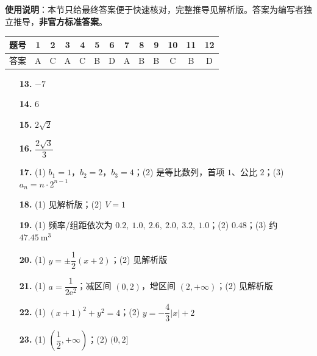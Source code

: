 
\begin{gknotice}
\textbf{使用说明}：本节只给最终答案便于快速核对，完整推导见解析版。答案为编写者独立推导，\textbf{非官方标准答案}。
\end{gknotice}

\begin{center}\begin{tabular}{ccccccccccccc}
\toprule
题号 & 1 & 2 & 3 & 4 & 5 & 6 & 7 & 8 & 9 & 10 & 11 & 12 \\
\midrule
答案 & A & C & A & C & B & D & A & B & B & C & B & D \\
\bottomrule
\end{tabular}\end{center}

\begin{itemize}[leftmargin=2.6em]
  \item[\textbf{13.}] $-7$
  \item[\textbf{14.}] $6$
  \item[\textbf{15.}] $2\sqrt2$
  \item[\textbf{16.}] $\dfrac{2\sqrt3}3$
\end{itemize}

\begin{itemize}[leftmargin=2.6em]
  \item[\textbf{17.}] (1) $b_1=1$，$b_2=2$，$b_3=4$；(2) 是等比数列，首项 $1$、公比 $2$；(3) $a_n=n\cdot2^{n-1}$
  \item[\textbf{18.}] (1) 见解析版；(2) $V=1$
  \item[\textbf{19.}] (1) 频率/组距依次为 $0.2,\ 1.0,\ 2.6,\ 2.0,\ 3.2,\ 1.0$；(2) $0.48$；(3) 约 $47.45\ \mathrm m^{3}$
  \item[\textbf{20.}] (1) $y=\pm\dfrac12(x+2)$；(2) 见解析版
  \item[\textbf{21.}] (1) $a=\dfrac1{2\mathrm e^{2}}$；减区间 $(0,2)$，增区间 $(2,+\infty)$；(2) 见解析版
\end{itemize}

\begin{itemize}[leftmargin=2.6em]
  \item[\textbf{22.}] (1) $(x+1)^{2}+y^{2}=4$；(2) $y=-\dfrac43|x|+2$
  \item[\textbf{23.}] (1) $\left(\dfrac12,+\infty\right)$；(2) $(0,2]$
\end{itemize}
